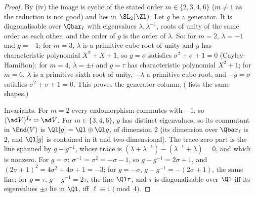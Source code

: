 \begin{proof}
By (iv) the image is cyclic of the stated order $m\in\{2,3,4,6\}$ ($m\ne1$ as the reduction is not good) and lies in
$\SL_2(\Zl)$. Let $g$ be a generator. It is diagonalisable over $\Qbar_\ell$ with eigenvalues $\lambda,\lambda^{-1}$, roots of unity of the same order as
each other, and the order of $g$ is the order of $\lambda$. So: for $m=2$, $\lambda=-1$ and $g=-1$; for $m=3$, $\lambda$ is a primitive cube root of
unity and $g$ has characteristic polynomial $X^2+X+1$, so $g=\sigma$ satisfies $\sigma^2+\sigma+1=0$ (Cayley-Hamilton); for $m=4$, $\lambda=\pm i$ and $g=\tau$
has characteristic polynomial $X^2+1$; for $m=6$, $\lambda$ is a primitive sixth root of unity, $-\lambda$ a primitive cube root, and $-g=\sigma$
satisfies $\sigma^2+\sigma+1=0$. This proves the generator column; ( lists the same shapes.)

Invariants. For $m=2$ every endomorphism commutes with $-1$, so $(\ad V)^{I_q}=\ad V$. For $m\in\{3,4,6\}$, $g$ has distinct eigenvalues, so its
commutant in $\End(V)$ is $\Ql[g]=\Ql\oplus\Ql g$, of dimension $2$ (its dimension over $\Qbar_\ell$ is $2$, and $\Ql[g]$ is contained in it and
two-dimensional). The trace-zero part is the line spanned by $g-g^{-1}$, whose trace is $(\lambda+\lambda^{-1})-(\lambda^{-1}+\lambda)=0$, and which is nonzero. For
$g=\sigma$: $\sigma^{-1}=\sigma^2=-\sigma-1$, so $g-g^{-1}=2\sigma+1$, and $(2\sigma+1)^2=4\sigma^2+4\sigma+1=-3$; for $g=-\sigma$, $g-g^{-1}=-(2\sigma+1)$, the same line;
for $g=\tau$, $g-g^{-1}=2\tau$, the line $\Ql\tau$, and $\tau$ is diagonalisable over $\Ql$ iff its eigenvalues $\pm i$ lie in $\Ql$, iff $\ell\equiv1\pmod4$.


\end{proof}
